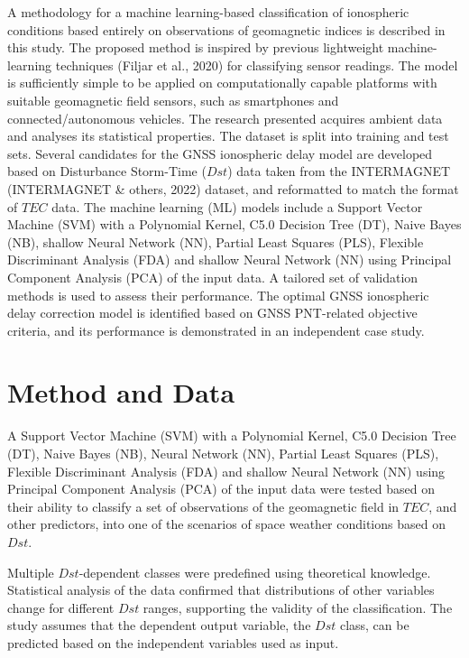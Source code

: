 \documentclass[sn-mathphys-num]{sn-jnl}%
\begin{document}
A methodology for a machine learning-based classification of ionospheric conditions based entirely on observations of geomagnetic indices is described in this study. The proposed method is inspired by previous lightweight machine-learning techniques (Filjar et al., 2020) for classifying sensor readings. The model is sufficiently simple to be applied on computationally capable platforms with suitable geomagnetic field sensors, such as smartphones and connected/autonomous vehicles. The research presented acquires ambient data and analyses its statistical properties. The dataset is split into training and test sets. Several candidates for the GNSS ionospheric delay model are developed based on Disturbance Storm-Time ($Dst$) data taken from the INTERMAGNET (INTERMAGNET & others, 2022) dataset, and reformatted to match the format of $TEC$ data. The machine learning (ML) models include a Support Vector Machine (SVM) with a Polynomial Kernel, C5.0 Decision Tree (DT), Naive Bayes (NB), shallow Neural Network (NN), Partial Least Squares (PLS), Flexible Discriminant Analysis (FDA) and shallow Neural Network (NN) using Principal Component Analysis (PCA) of the input data. A tailored set of validation methods is used to assess their performance. The optimal GNSS ionospheric delay correction model is identified based on GNSS PNT-related objective criteria, and its performance is demonstrated in an independent case study.

\section{Method and Data}
\label{sec:Dataset}

A Support Vector Machine (SVM) with a Polynomial Kernel, C5.0 Decision Tree (DT), Naive Bayes (NB), Neural Network (NN), Partial Least Squares (PLS), Flexible Discriminant Analysis (FDA) and shallow Neural Network (NN) using Principal Component Analysis (PCA) of the input data were tested based on their ability to classify a set of observations of the geomagnetic field in $TEC$, and other predictors, into one of the scenarios of space weather conditions based on $Dst$. 

Multiple $Dst$-dependent classes were predefined using theoretical knowledge. Statistical analysis of the data confirmed that distributions of other variables change for different $Dst$ ranges, supporting the validity of the classification. The study assumes that the dependent output variable, the $Dst$ class, can be predicted based on the independent variables used as input.
\end{document}
